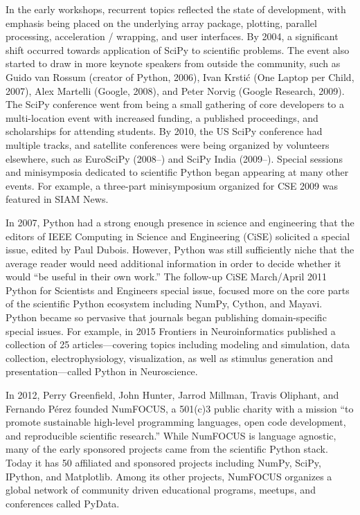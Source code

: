 \documentclass[fleqn,10pt]{wlscirep}
\begin{document}

In the early workshops, recurrent topics reflected the state of development, with
emphasis being placed on the underlying array package, plotting,
parallel processing, acceleration / wrapping, and user interfaces.  By
2004, a significant shift occurred towards application of SciPy to
scientific problems.  The event also started to draw in more keynote
speakers from outside the community, such as Guido van Rossum (creator
of Python, 2006), Ivan Krstić (One Laptop per Child, 2007), Alex
Martelli (Google, 2008), and Peter Norvig (Google Research, 2009).
The SciPy conference went from being a small gathering of
core developers to a multi-location event with increased funding, a
published proceedings, and scholarships for attending students.
By 2010, the US SciPy conference had multiple tracks, and satellite
conferences were being organized by volunteers elsewhere, such as EuroSciPy
(2008–) and SciPy India (2009–).
Special sessions and minisymposia dedicated to scientific Python began
appearing at many other events.
For example, a three-part minisymposium organized for CSE 2009 was
featured in SIAM News\cite{siamcse09}.

In 2007, Python had a strong enough presence in science and engineering
that the editors of IEEE Computing in Science and Engineering
(CiSE) solicited a special issue\cite{dubois2007guest}, edited by Paul
Dubois. However, Python was still sufficiently niche that the average reader
would need additional information in order to decide whether it would
``be useful in their own work.''
The follow-up CiSE March/April 2011 Python for Scientists and Engineers
special issue\cite{millman2011python}, focused more on the core parts
of the scientific Python ecosystem\cite{perez2011python} including
NumPy\cite{vanderwalt2011numpy}, Cython\cite{behnel2011cython},
and Mayavi\cite{ramachandran2011mayavi}. Python became so pervasive that 
journals began publishing domain-specific special issues.
For example, in 2015 Frontiers in Neuroinformatics published a collection of 25 articles---covering
topics including modeling and simulation, data collection, electrophysiology, visualization,
as well as stimulus generation and presentation---called Python in
Neuroscience\cite{python-FIN}.

In 2012, Perry Greenfield, John Hunter, Jarrod Millman, Travis Oliphant,
and Fernando Pérez founded NumFOCUS\cite{numfocus},
 a 501(c)3 public charity with a mission
``to promote sustainable high-level programming languages, open code development,
and reproducible scientific research.''
While NumFOCUS is language agnostic, many of the early sponsored projects
came from the scientific Python stack.
Today it has 50 affiliated and sponsored projects including NumPy, SciPy, IPython, and
Matplotlib.
Among its other projects, NumFOCUS organizes a global network of 
community driven educational programs, meetups, and conferences
called PyData.
\end{document}
